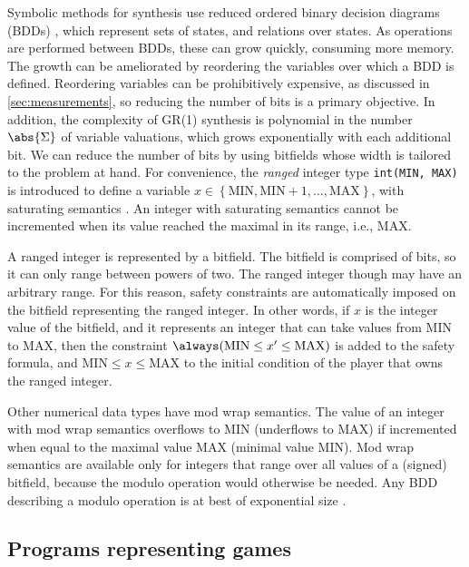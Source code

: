 \documentclass[copyright]{eptcs}
\begin{document}
Symbolic methods for synthesis use reduced ordered binary decision diagrams (BDDs) \cite{Bryant86tc,Baier08}, which represent sets of states, and relations over states.
As operations are performed between BDDs, these can grow quickly, consuming more memory.
The growth can be ameliorated by reordering the variables over which a BDD is defined.
Reordering variables can be prohibitively expensive, as discussed in \cref{sec:measurements}, so reducing the number of bits is a primary objective.
In addition, the complexity of GR(1) synthesis is polynomial in the number $\abs{\Sigma}$ of variable valuations, which grows exponentially with each additional bit.
We can reduce the number of bits by using bitfields whose width is tailored to the problem at hand.
For convenience, the {\em ranged} integer type \texttt{int(MIN, MAX)} is introduced to define a variable $x \in \left\{\mathrm{MIN}, \mathrm{MIN} + 1, \dots, \mathrm{MAX}\right\}$, with saturating semantics \cite{Gennari07cmu}.
An integer with saturating semantics cannot be incremented when its value reached the maximal in its range, i.e., $\mathrm{MAX}$.

A ranged integer is represented by a bitfield.
The bitfield is comprised of bits, so it can only range between powers of two.
The ranged integer though may have an arbitrary range.
For this reason, safety constraints are automatically imposed on the bitfield representing the ranged integer.
In other words, if $x$ is the integer value of the bitfield, and it represents an integer that can take values from $\mathrm{MIN}$ to $\mathrm{MAX}$, then the constraint $\always (\mathrm{MIN} \leq x' \leq \mathrm{MAX})$ is added to the safety formula, and $\mathrm{MIN} \leq x \leq \mathrm{MAX}$ to the initial condition of the player that owns the ranged integer.

Other numerical data types have mod wrap semantics.
The value of an integer with mod wrap semantics overflows to $\mathrm{MIN}$ (underflows to $\mathrm{MAX}$) if incremented when equal to the maximal value $\mathrm{MAX}$ (minimal value $\mathrm{MIN}$).
Mod wrap semantics are available only for integers that range over all values of a (signed) bitfield, because the modulo operation would otherwise be needed.
Any BDD describing a modulo operation is at best of exponential size \cite{Bryant86tc}.


\subsection{Programs representing games}
\label{sec:game-graphs}
\end{document}

